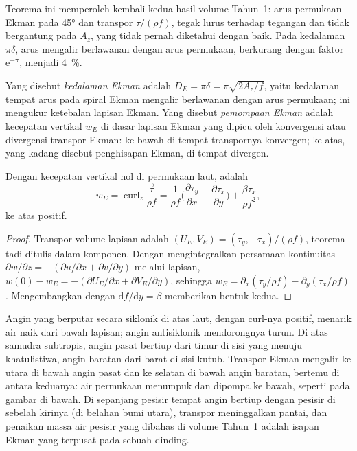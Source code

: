 Teorema ini memperoleh kembali kedua hasil volume Tahun~1: arus permukaan Ekman
pada \ang{45} dan transpor $\tau/(\rho f)$, tegak lurus terhadap
tegangan dan tidak bergantung pada $A_z$, yang tidak pernah diketahui dengan baik. Pada
kedalaman $\pi\delta$, arus mengalir berlawanan dengan arus permukaan, berkurang
dengan faktor $\mathrm e^{-\pi}$, menjadi \qty{4}{\percent}.

\begin{definition}\label{def:b3:ocean-dynamics:ekman-pumping}
Yang disebut \emph{kedalaman Ekman} adalah $D_E = \pi\delta =
\pi\sqrt{2A_z/f}$, yaitu kedalaman tempat arus pada spiral Ekman
mengalir berlawanan dengan arus permukaan; ini mengukur ketebalan
lapisan Ekman. Yang disebut \emph{pemompaan Ekman} adalah kecepatan vertikal
$w_E$ di dasar lapisan Ekman yang dipicu oleh konvergensi atau
divergensi transpor Ekman: ke bawah di tempat transpornya
konvergen; ke atas, yang kadang disebut penghisapan Ekman, di tempat divergen.
\end{definition}

\begin{proposition}\label{prop:b3:ocean-dynamics:pumping}
Dengan kecepatan vertikal nol di permukaan laut,  adalah
\[
w_E = \operatorname{curl}_z\frac{\vec\tau}{\rho f}
= \frac{1}{\rho f}\Big(\frac{\partial\tau_y}{\partial x} -
\frac{\partial\tau_x}{\partial y}\Big) + \frac{\beta\tau_x}{\rho f^2} ,
\]
ke atas positif.
\end{proposition}

\begin{proof}
Transpor volume lapisan adalah $(U_E, V_E) = (\tau_y,
-\tau_x)/(\rho f)$, teorema tadi ditulis dalam komponen. Dengan mengintegralkan
persamaan kontinuitas $\partial w/\partial z = -(\partial u/\partial x +
\partial v/\partial y)$ melalui lapisan, $w(0) - w_E = -(\partial
U_E/\partial x + \partial V_E/\partial y)$, sehingga $w_E = \partial_x(\tau_y/\rho
f) - \partial_y(\tau_x/\rho f)$. Mengembangkan dengan $\mathrm df/\mathrm dy =
\beta$ memberikan bentuk kedua.
\end{proof}

Angin yang berputar secara siklonik di atas laut, dengan curl-nya positif, menarik
air naik dari bawah lapisan; angin antisiklonik mendorongnya turun. Di
atas samudra subtropis, angin pasat bertiup dari timur di
sisi yang menuju khatulistiwa, angin baratan dari barat di sisi kutub. Transpor Ekman
mengalir ke utara di bawah angin pasat dan ke selatan di bawah angin baratan,
bertemu di antara keduanya: air permukaan menumpuk dan dipompa ke bawah, seperti
pada gambar di bawah. Di sepanjang pesisir tempat
angin bertiup dengan pesisir di sebelah kirinya (di belahan bumi utara), transpor
meninggalkan pantai, dan penaikan massa air pesisir yang dibahas di volume Tahun~1
adalah isapan Ekman yang terpusat pada sebuah dinding.

